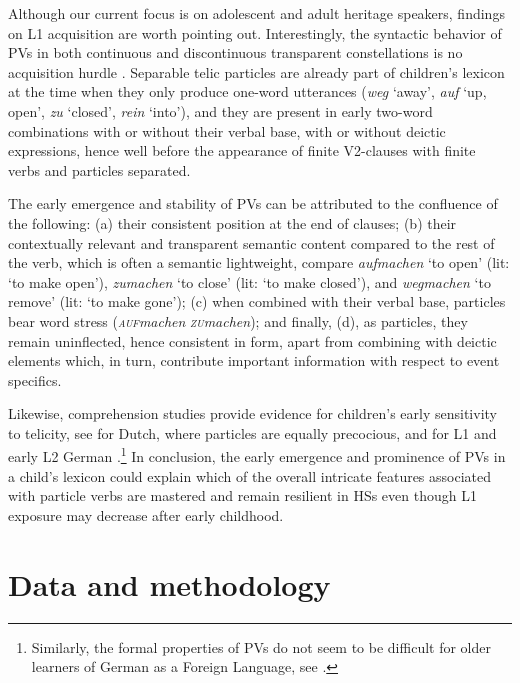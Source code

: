\documentclass[output=paper,colorlinks,citecolor=brown]{langscibook}
\begin{document}
Although our current focus is on adolescent and adult heritage speakers, findings on L1 acquisition are worth pointing out. Interestingly, the syntactic behavior of PVs in both continuous and discontinuous transparent constellations is no acquisition hurdle \citep{SchulzTracy2011, Tracy2011Konstruktion, Tracy1991}. Separable telic particles are already part of children’s lexicon at the time when they only produce one-word utterances (\textit{weg} `away', \textit{auf} `up, open', \textit{zu} `closed', \textit{rein} `into'), and they are present in early two-word combinations with or without their verbal base, with or without deictic expressions, hence well before the appearance of finite V2-clauses with finite verbs and particles separated. 

The early emergence and stability of PVs can be attributed to the confluence of the following: (a) their consistent position at the end of clauses; (b) their contextually relevant and transparent semantic content compared to the rest of the verb, which is often a semantic lightweight, compare \textit{aufmachen} `to open' (lit: `to make open'), \textit{zumachen} `to close' (lit: `to make closed'), and \textit{wegmachen} `to remove' (lit: `to make gone'); (c) when combined with their verbal base, particles bear word stress (\textit{\textsc{auf}machen} \textit{\textsc{zu}machen}); and finally, (d), as particles, they remain uninflected, hence consistent in form, apart from combining with deictic elements which, in turn, contribute important information with respect to event specifics.

Likewise, comprehension studies provide evidence for children's early sensitivity to telicity, see \citet{VanHout2000} for Dutch, where particles are equally precocious, and for L1 and early L2 German \citep{SchulzTracy2011}.\footnote{Similarly, the formal properties of PVs do not seem to be difficult for older learners of German as a Foreign Language, see \citet{LuedelingHirschmannShadrova2017Productivity}.} 
In conclusion, the early emergence and prominence of PVs in a child's lexicon could explain which of the overall intricate features associated with particle verbs are mastered and remain resilient in HSs even though L1 exposure may decrease after early childhood.



\section{Data and methodology} \label{sec:kelleretal:data-method}
\end{document}
